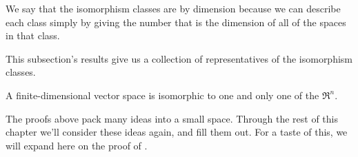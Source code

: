 We say that the isomorphism classes are 
%
by dimension because we can
describe each class simply by giving the number that is the dimension of
all of the spaces in that class.

This subsection's results give us a collection of 
representatives of the isomorphism 
classes. %
 
\begin{corollary}
A finite-dimensional vector space is isomorphic to one and only one
of the $\Re^n$.
\end{corollary}

The proofs above pack many ideas into a small space.
Through the rest of this chapter
we'll consider these ideas again, and fill them out.
For a taste of this, we will expand here 
on the proof of .

